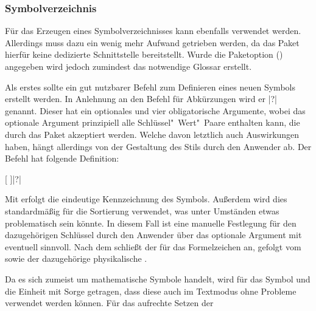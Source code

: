 \documentclass[%
  english,ngerman,%
  cdgeometry=no,DIV=12,automark%
]{tudscrartcl}
\begin{document}
\subsubsection{Symbolverzeichnis}
Für das Erzeugen eines Symbolverzeichnisses kann ebenfalls  
verwendet werden. Allerdings muss dazu ein wenig mehr Aufwand getrieben werden, 
da das Paket hierfür keine dedizierte Schnittstelle bereitstellt. Wurde die 
Paketoption () angegeben wird jedoch 
zumindest das notwendige Glossar erstellt.

Als erstes sollte ein gut nutzbarer Befehl zum Definieren eines neuen Symbols 
erstellt werden. In Anlehnung an den Befehl für Abkürzungen  
wird er |?| genannt. Dieser hat ein optionales und vier 
obligatorische Argumente, wobei das optionale Argument prinzipiell alle 
Schlüssel"~Wert"~Paare enthalten kann, die durch das Paket  
akzeptiert werden. Welche davon letztlich auch Auswirkungen haben, hängt 
allerdings von der Gestaltung des Stils durch den Anwender ab. Der Befehl hat 
folgende Definition:
%
\begin{quoting}[leftmargin=\parindent]
[%
  \LParameter{}%
]|?|%
\end{quoting}
%
Mit  erfolgt die eindeutige Kennzeichnung des Symbols. Außerdem 
wird dies standardmäßig für die Sortierung verwendet, was unter Umständen etwas
problematisch sein könnte. In diesem Fall ist eine manuelle Festlegung für den 
dazugehörigen Schlüssel durch den Anwender über das optionale Argument mit 
 eventuell sinnvoll. Nach dem  
schließt der  für das Formelzeichen an, gefolgt vom  
sowie der dazugehörige physikalische .
%
\CodeHook{\let\newcommand\renewcommand}
\begin{Preamble*}
\newcommand*{\newformulasymbol}[5][]{%
  \newglossaryentry{#2}{%
    type=symbols,%
    name={#3},%
    description={\nopostdesc},%
    symbol={\ensuremath{#4}},%
    user1={\ensuremath{\mathrm{#5}}},%
    sort={#2},%
    #1%
  }%
}

\end{Preamble*}
%
Da es sich zumeist um mathematische Symbole handelt, wird für das Symbol und 
die Einheit mit  Sorge getragen, dass diese auch im 
Textmodus ohne Probleme verwendet werden können. Für das aufrechte Setzen der 
\end{document}

